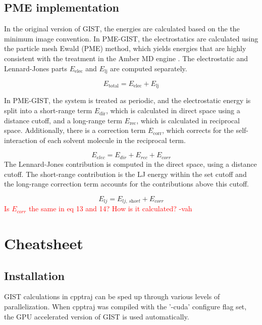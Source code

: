 \documentclass[9pt,tutorial]{livecoms}
\newcommand{\todo}{\textcolor{red}}
\begin{document}
\subsection{PME implementation}

In the original version of GIST, the energies are calculated based on the the minimum image convention.
In PME-GIST, the electrostatics are calculated using the particle mesh Ewald (PME) method, which yields energies that are highly consistent with the treatment in the Amber MD engine \cite{Chen2021}.
The electrostatic and Lennard-Jones parts $E_\text{elec}$ and $E_\text{lj}$ are computed separately.

\begin{equation}
	E_\text{total} = E_\text{elec} + E_\text{lj}
\end{equation}

In PME-GIST, the system is treated as periodic, and the electrostatic energy is split into a short-range term $E_\text{dir}$, which is calculated in direct space using a distance cutoff, and a long-range term $E_\text{rec}$, which is calculated in reciprocal space.
Additionally, there is a correction term $E_\text{corr}$, which corrects for the self-interaction of each solvent molecule in the reciprocal term.

\begin{equation}
	E_\textit{elec} = E_\textit{dir} + E_\textit{rec} + E_\textit{corr}
\end{equation}
The Lennard-Jones contribution is computed in the direct space, using a distance cutoff. The short-range contribution is the LJ energy within the set cutoff and the long-range correction term accounts for the contributions above this cutoff.

\begin{equation}
	E_\textit{lj} = E_\textit{lj,\ short} +  E_\textit{corr}
\end{equation}
\todo{Is $E_{corr}$ the same in eq 13 and 14? How is it calculated? -vah}


\section{Cheatsheet}
\subsection{Installation}
GIST calculations in cpptraj can be sped up through various levels of 
parallelization. When cpptraj was compiled with the '-cuda' configure flag set, 
the GPU accelerated version of GIST is used automatically. 
\end{document}
